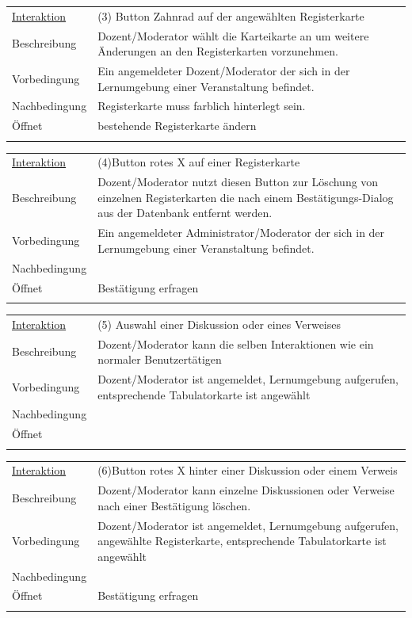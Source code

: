 \documentclass[12pt,a4paper]{article}
\begin{document}
{\begin{tabular}{l p{12cm}}
\underline{Interaktion} & (3) Button Zahnrad auf der angewählten Registerkarte\\ 
Beschreibung   	 		& Dozent/Moderator wählt die Karteikarte an um weitere Änderungen an den Registerkarten vorzunehmen. \\
Vorbedingung	 		& Ein angemeldeter Dozent/Moderator der sich in der Lernumgebung einer Veranstaltung befindet.\\
Nachbedingung	 		& Registerkarte muss farblich hinterlegt sein.\\
Öffnet			 		& \glqq bestehende Registerkarte ändern\grqq \\\\
\end{tabular}

\begin{tabular}{l p{12cm}}
\underline{Interaktion} & (4)Button rotes X auf einer Registerkarte  \\ 
Beschreibung   	 		& Dozent/Moderator nutzt diesen Button zur Löschung von einzelnen Registerkarten die nach einem Bestätigungs-Dialog aus der Datenbank entfernt werden. \\
Vorbedingung	 		& Ein angemeldeter Administrator/Moderator der sich in der Lernumgebung einer Veranstaltung befindet. \\
Nachbedingung	 		& \\
Öffnet			 		& \glqq Bestätigung erfragen \grqq \\\\
\end{tabular}

\begin{tabular}{l p{12cm}}
\underline{Interaktion} & (5)  Auswahl einer Diskussion oder eines Verweises \\ 
Beschreibung   	 		& Dozent/Moderator kann die selben Interaktionen wie ein \glqq normaler Benutzer\grqq tätigen \\
Vorbedingung	 		& Dozent/Moderator ist angemeldet, Lernumgebung aufgerufen, entsprechende Tabulatorkarte ist angewählt\\
Nachbedingung	 		& \\
Öffnet			 		&  \\\\
\end{tabular}

\begin{tabular}{l p{12cm}}
\underline{Interaktion} & (6)Button rotes X hinter einer Diskussion oder einem Verweis\\ 
Beschreibung   	 		& Dozent/Moderator kann einzelne Diskussionen oder Verweise nach einer Bestätigung löschen. \\
Vorbedingung	 		& Dozent/Moderator ist angemeldet, Lernumgebung aufgerufen, angewählte Registerkarte, entsprechende Tabulatorkarte ist angewählt\\
Nachbedingung	 		& \\
Öffnet			 		& \glqq Bestätigung erfragen\grqq \\\\
\end{tabular}

}
\end{document}
